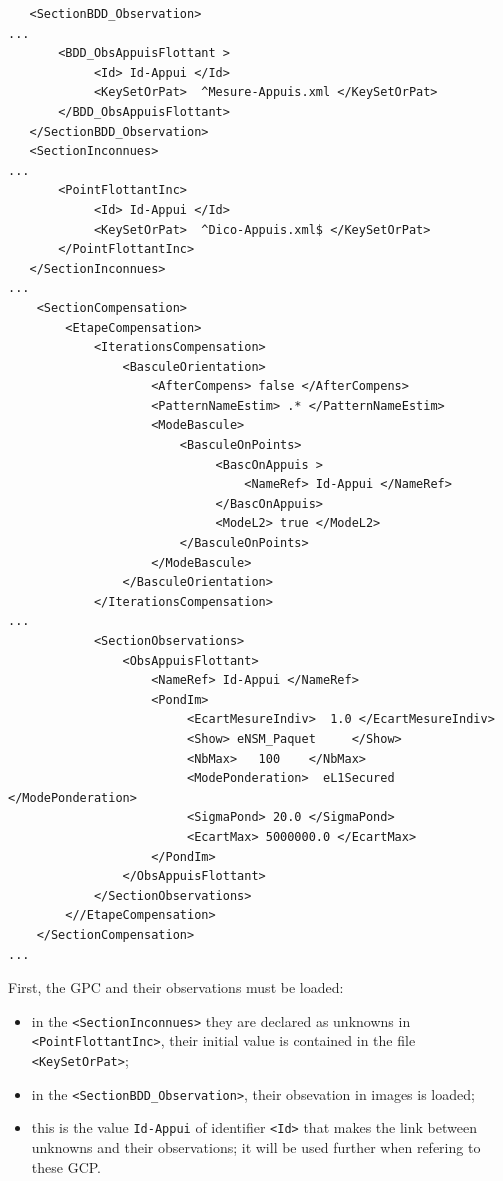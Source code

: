 {\scriptsize
\begin{verbatim}
   <SectionBDD_Observation>
...
       <BDD_ObsAppuisFlottant >
            <Id> Id-Appui </Id>
            <KeySetOrPat>  ^Mesure-Appuis.xml </KeySetOrPat>
       </BDD_ObsAppuisFlottant>
   </SectionBDD_Observation>
   <SectionInconnues>
...
       <PointFlottantInc>
            <Id> Id-Appui </Id>
            <KeySetOrPat>  ^Dico-Appuis.xml$ </KeySetOrPat>
       </PointFlottantInc>
   </SectionInconnues>
...
    <SectionCompensation>
        <EtapeCompensation>
            <IterationsCompensation>
                <BasculeOrientation>
                    <AfterCompens> false </AfterCompens>
                    <PatternNameEstim> .* </PatternNameEstim>
                    <ModeBascule>
                        <BasculeOnPoints>
                             <BascOnAppuis >
                                 <NameRef> Id-Appui </NameRef>
                             </BascOnAppuis>
                             <ModeL2> true </ModeL2>
                        </BasculeOnPoints>
                    </ModeBascule>
                </BasculeOrientation>
            </IterationsCompensation>
...
            <SectionObservations>
                <ObsAppuisFlottant>
                    <NameRef> Id-Appui </NameRef>
                    <PondIm>
                         <EcartMesureIndiv>  1.0 </EcartMesureIndiv>
                         <Show> eNSM_Paquet     </Show>
                         <NbMax>   100    </NbMax>
                         <ModePonderation>  eL1Secured </ModePonderation>
                         <SigmaPond> 20.0 </SigmaPond>
                         <EcartMax> 5000000.0 </EcartMax>
                    </PondIm>
                </ObsAppuisFlottant>
            </SectionObservations>
        <//EtapeCompensation>
    </SectionCompensation>
...
\end{verbatim}
}

First, the GPC and their observations must be loaded:

\begin{itemize}
   \item in the {\tt <SectionInconnues>} they are declared as unknowns in {\tt <PointFlottantInc>},
         their initial value is contained in the file {\tt <KeySetOrPat>};

  \item  in the  {\tt <SectionBDD\_Observation>}, their obsevation in images is loaded;

   \item this is the value {\tt Id-Appui} of  identifier {\tt <Id>}
         that makes the link between unknowns and their observations; it will be used
         further when refering to these GCP.
\end{itemize}

